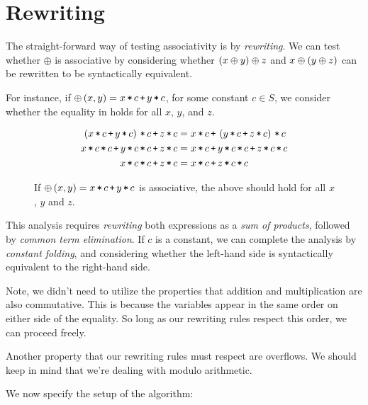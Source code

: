 
\section{Rewriting}

The straight-forward way of testing associativity is by \emph{rewriting}. We
can test whether $\oplus$ is associative by considering whether $\left({x \oplus y}\right)
\oplus z$ and $x \oplus \left({y \oplus z}\right)$ can be rewritten to be syntactically
equivalent.

For instance, if $\oplus\p{x,y} = x\lt c \lp y \lt c$, for some constant $c\in
S$, we consider whether the equality in  holds
for all $x$, $y$, and $z$.

\begin{figure*}[htbp!]
\begin{align*}
\p{x\lt c \lp y\lt c}\lt c \lp z\lt c &= x\lt c \lp \p{y\lt c \lp z\lt c}\lt c \\
x\lt c \lt c \lp y\lt c \lt c \lp z\lt c &= x\lt c \lp y\lt c \lt c \lp z\lt c \lt c \\
x\lt c \lt c \lp z\lt c &= x\lt c \lp z\lt c \lt c
\end{align*}
\caption[]{If $\oplus\p{x,y}=x\lt c \lp y\lt c$ is associative, the above
should hold for all $x$, $y$ and $z$.}
\label{figure:first-equality}
\end{figure*}

This analysis requires \emph{rewriting} both expressions as a \emph{sum of
products}, followed by \emph{common term elimination}. If $c$ is a constant, we
can complete the analysis by \emph{constant folding}, and considering whether
the left-hand side is syntactically equivalent to the right-hand side.

Note, we didn't need to utilize the properties that addition and multiplication
are also commutative.  This is because the variables appear in the same order
on either side of the equality. So long as our rewriting rules respect this
order, we can proceed freely. 

Another property that our rewriting rules must respect are overflows. We should
keep in mind that we're dealing with modulo arithmetic.

We now specify the setup of the algorithm:

